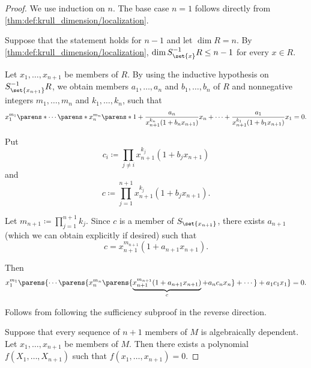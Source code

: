 \begin{proof}
  \SufficiencySubProof* We use induction on \( n \). The base case \( n = 1 \) follows directly from \cref{thm:def:krull_dimension/localization}.

  Suppose that the statement holds for \( n - 1 \) and let \( \dim R = n \). By \cref{thm:def:krull_dimension/localization}, \( \dim S_{\set{ x }}^{-1} R \leq n - 1 \) for every \( x \in R \).

  Let \( x_1, \ldots, x_{n+1} \) be members of \( R \). By using the inductive hypothesis on \( S_{\set{ x_{n+1} }}^{-1} R \), we obtain members \( a_1, \ldots, a_n \) and \( b_1, \ldots, b_n \) of \( R \) and nonnegative integers \( m_1, \ldots, m_n \) and \( k_1, \ldots, k_n \), such that
  \begin{equation*}
    x_1^{m_1} \parens*{ \cdots \parens*{ x_n^{m_n} \parens*{ 1 + \frac {a_n} {x_{n+1}^{k_n} (1 + b_n x_{n+1}) } x_n } + \cdots } + \frac {a_1} {x_{n+1}^{k_1} (1 + b_1 x_{n+1}) } x_1 } = 0.
  \end{equation*}

  Put
  \begin{equation*}
    c_i \coloneqq \prod_{j \neq i} x_{n+1}^{k_j} (1 + b_j x_{n+1})
  \end{equation*}
  and
  \begin{equation*}
    c \coloneqq \prod_{j=1}^{n+1} x_{n+1}^{k_j} (1 + b_j x_{n+1}).
  \end{equation*}

  Let \( m_{n+1} \coloneqq \prod_{j=1}^{n+1} k_j \). Since \( c \) is a member of \( S_{\set{ x_{n+1} }} \), there exists \( a_{n+1} \) (which we can obtain explicitly if desired) such that
  \begin{equation*}
    c = x_{n+1}^{m_{n+1}} (1 + a_{n+1} x_{n+1}).
  \end{equation*}

  Then
  \begin{equation*}
    x_1^{m_1} \parens{ \cdots \parens{ x_n^{m_n} \parens{ \underbrace{ x_{n+1}^{m_{n+1}} (1 + a_{n+1} x_{n+1}) }_c + a_n c_n x_n } + \cdots } + a_1 c_1 x_1 } = 0.
  \end{equation*}

  \NecessitySubProof* Follows from following the sufficiency subproof in the reverse direction.

   Suppose that every sequence of \( n + 1 \) members of \( M \) is algebraically dependent. Let \( x_1, \ldots, x_{n+1} \) be members of \( M \). Then there exists a polynomial \( f(X_1, \ldots, X_{n+1}) \) such that \( f(x_1, \ldots, x_{n+1}) = 0 \).


\end{proof}

